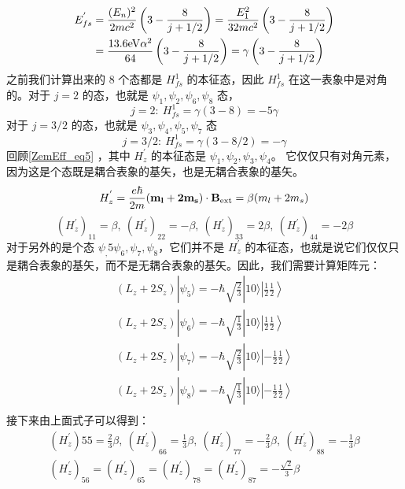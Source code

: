 \begin{align}
E_{fs}^{'}&=\frac{(E_n)^2}{2mc^2}\left(3-\frac{8}{j+1/2}\right)=\frac{E_1^2}{32mc^2}\left(3-\frac{8}{j+1/2}\right)\\
&=\frac{13.6\rm{eV}\alpha^2}{64}\left(3-\frac{8}{j+1/2}\right)=\gamma\left(3-\frac{8}{j+1/2}\right)
\end{align}
之前我们计算出来的 $8$ 个态都是 $H_{fs}^1$ 的本征态，因此 $H_{fs}^1$ 在这一表象中是对角的。对于 $j=2$ 的态，也就是 $\psi_1,\psi_2,\psi_6,\psi_8$ 态，
\begin{equation}
j=2: \ H_{fs}^1=\gamma(3-8)=-5\gamma
\end{equation}
对于 $j=3/2$ 的态，也就是 $\psi_3,\psi_4,\psi_5,\psi_7$ 态
\begin{equation}
j=3/2: \ H_{fs}^1=\gamma(3-8/2)=-\gamma
\end{equation}
回顾\autoref{ZemEff_eq5} ，其中 $H_z^{'}$ 的本征态是 $\psi_1,\psi_2,\psi_3,\psi_4$。 它仅仅只有对角元素，因为这是个态既是耦合表象的基矢，也是无耦合表象的基矢。
\begin{equation}
H_z^{'} = \frac{e\hbar}{2m}(\mathbf{m_l+2m_s})\cdot \mathbf{B}_{\rm{ext}}=\beta(m_l+2m_s)
\end{equation}
\begin{equation}
(H_z^{'})_{11}=\beta,\ (H_z^{'})_{22}=-\beta,\ (H_z^{'})_{33}=2\beta,\ (H_z^{'})_{44}=-2\beta
\end{equation}
对于另外的是个态 $\psi_,5\psi_6,\psi_7,\psi_8$，它们并不是 $H_{z}^{'}$ 的本征态，也就是说它们仅仅只是耦合表象的基矢，而不是无耦合表象的基矢。因此，我们需要计算矩阵元：
\begin{align}
(L_z+2S_z)|\psi_5\rangle= -\hbar\sqrt{\frac{2}{3}}|10\rangle\left|\frac{1}{2}\frac{1}{2}\right\rangle\\
(L_z+2S_z)|\psi_6\rangle=-\hbar\sqrt{\frac{1}{3}}|10\rangle\left|\frac{1}{2}\frac{1}{2}\right\rangle \\
(L_z+2S_z)|\psi_7\rangle=-\hbar\sqrt{\frac{2}{3}}|10\rangle\left|-\frac{1}{2}\frac{1}{2}\right\rangle \\
(L_z+2S_z)|\psi_8\rangle= -\hbar\sqrt{\frac{1}{3}}|10\rangle\left|-\frac{1}{2}\frac{1}{2}\right\rangle\\
\end{align}
接下来由上面式子可以得到：
\begin{align}
(H_z^{'}){55}=\frac{2}{3}\beta,\ (H_z^{'})_{66}=\frac{1}{3}\beta,\ (H_z^{'})_{77}=-\frac{2}{3}\beta,\ (H_z^{'})_{88}=-\frac{1}{3}\beta\\
(H_z^{'})_{56}=(H_z^{'})_{65}=(H_z^{'})_{78}=(H_z^{'})_{87}=-\frac{\sqrt{2}}{3}\beta
\end{align}
